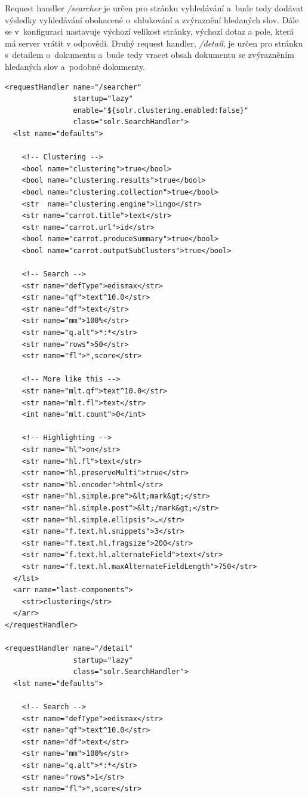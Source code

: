 Request handler \emph{/searcher} je určen pro stránku vyhledávání a~bude tedy dodávat výsledky vyhledávání obohacené o~shlukování a zvýraznění hledaných slov. Dále se v~konfiguraci nastavuje výchozí velikost stránky, výchozí dotaz a pole, která má server vrátit v odpovědi. Druhý request handler, \emph{/detail}, je určen pro stránku s~detailem o~dokumentu a~bude tedy vracet obsah dokumentu se zvýrazněním hledaných slov a~podobné dokumenty.

\begin{verbatim}
<requestHandler name="/searcher"
                startup="lazy"
                enable="${solr.clustering.enabled:false}"
                class="solr.SearchHandler">
  <lst name="defaults">
  
    <!-- Clustering -->
    <bool name="clustering">true</bool>
    <bool name="clustering.results">true</bool>
    <bool name="clustering.collection">true</bool>
    <str  name="clustering.engine">lingo</str>
    <str name="carrot.title">text</str>
    <str name="carrot.url">id</str>
    <bool name="carrot.produceSummary">true</bool>
    <bool name="carrot.outputSubClusters">true</bool>
    
    <!-- Search -->
    <str name="defType">edismax</str>
    <str name="qf">text^10.0</str>
    <str name="df">text</str>
    <str name="mm">100%</str>
    <str name="q.alt">*:*</str>
    <str name="rows">50</str>
    <str name="fl">*,score</str>
    
    <!-- More like this -->
    <str name="mlt.qf">text^10.0</str>
    <str name="mlt.fl">text</str>
    <int name="mlt.count">0</int>
    
    <!-- Highlighting -->
    <str name="hl">on</str>
    <str name="hl.fl">text</str>
    <str name="hl.preserveMulti">true</str>
    <str name="hl.encoder">html</str>
    <str name="hl.simple.pre">&lt;mark&gt;</str>
    <str name="hl.simple.post">&lt;/mark&gt;</str>
    <str name="hl.simple.ellipsis">…</str>
    <str name="f.text.hl.snippets">3</str>
    <str name="f.text.hl.fragsize">200</str>
    <str name="f.text.hl.alternateField">text</str>
    <str name="f.text.hl.maxAlternateFieldLength">750</str>
  </lst>
  <arr name="last-components">
    <str>clustering</str>
  </arr>
</requestHandler>

<requestHandler name="/detail"
                startup="lazy"
                class="solr.SearchHandler">
  <lst name="defaults">
  
    <!-- Search -->
    <str name="defType">edismax</str>
    <str name="qf">text^10.0</str>
    <str name="df">text</str>
    <str name="mm">100%</str>
    <str name="q.alt">*:*</str>
    <str name="rows">1</str>
    <str name="fl">*,score</str>
    

\end{verbatim}
